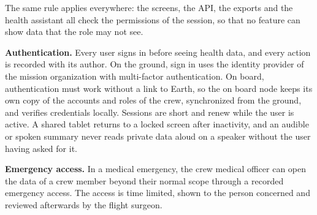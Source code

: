 The same rule applies everywhere: the screens, the API, the exports and the health assistant all check the permissions of the session, so that no feature can show data that the role may not see.

\medskip\noindent\textbf{Authentication.} Every user signs in before seeing health data, and every action is recorded with its author. On the ground, sign in uses the identity provider of the mission organization with multi-factor authentication. On board, authentication must work without a link to Earth, so the on board node keeps its own copy of the accounts and roles of the crew, synchronized from the ground, and verifies credentials locally. Sessions are short and renew while the user is active. A shared tablet returns to a locked screen after inactivity, and an audible or spoken summary never reads private data aloud on a speaker without the user having asked for it.

\medskip\noindent\textbf{Emergency access.} In a medical emergency, the crew medical officer can open the data of a crew member beyond their normal scope through a recorded emergency access. The access is time limited, shown to the person concerned and reviewed afterwards by the flight surgeon.
